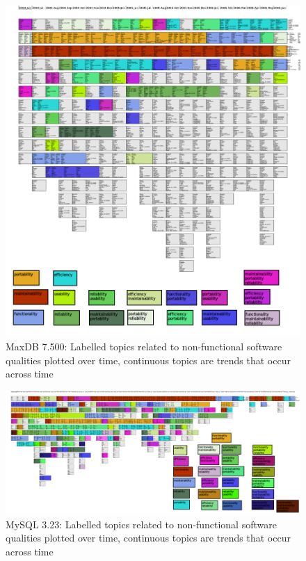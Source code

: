 \documentclass[]{sig-alternate}
\begin{document}
\begin{figure}
  \centering
  \includegraphics[height=.55\textheight]{small-maxdb-time-smear-plot-Equal}
  \caption{MaxDB 7.500: Labelled topics related to non-functional software qualities plotted over time, continuous topics are trends that occur across time}
  \label{fig:maxdb}
\end{figure}

\begin{figure}%
  \centering
  \includegraphics[width=.97\textwidth]{small-mysql-time-smear-plot-Equal}
  \caption{MySQL 3.23: Labelled topics related to non-functional software qualities plotted over time, continuous topics are trends that occur across time}
  \label{fig:mysql}
\end{figure}
\end{document}
